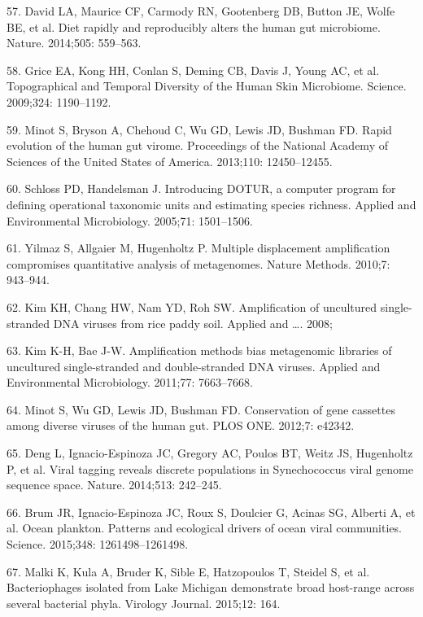 \documentclass[12pt,]{article}
\begin{document}
\hypertarget{ref-David:2014cl}{}
57. David LA, Maurice CF, Carmody RN, Gootenberg DB, Button JE, Wolfe
BE, et al. Diet rapidly and reproducibly alters the human gut
microbiome. Nature. 2014;505: 559--563.

\hypertarget{ref-Grice:2009ee}{}
58. Grice EA, Kong HH, Conlan S, Deming CB, Davis J, Young AC, et al.
Topographical and Temporal Diversity of the Human Skin Microbiome.
Science. 2009;324: 1190--1192.

\hypertarget{ref-Minot:2013ih}{}
59. Minot S, Bryson A, Chehoud C, Wu GD, Lewis JD, Bushman FD. Rapid
evolution of the human gut virome. Proceedings of the National Academy
of Sciences of the United States of America. 2013;110: 12450--12455.

\hypertarget{ref-Schloss:2005hz}{}
60. Schloss PD, Handelsman J. Introducing DOTUR, a computer program for
defining operational taxonomic units and estimating species richness.
Applied and Environmental Microbiology. 2005;71: 1501--1506.

\hypertarget{ref-Yilmaz:2010jb}{}
61. Yilmaz S, Allgaier M, Hugenholtz P. Multiple displacement
amplification compromises quantitative analysis of metagenomes. Nature
Methods. 2010;7: 943--944.

\hypertarget{ref-Kim:2008to}{}
62. Kim KH, Chang HW, Nam YD, Roh SW. Amplification of uncultured
single-stranded DNA viruses from rice paddy soil. Applied and \ldots{}.
2008;

\hypertarget{ref-Kim:2011hp}{}
63. Kim K-H, Bae J-W. Amplification methods bias metagenomic libraries
of uncultured single-stranded and double-stranded DNA viruses. Applied
and Environmental Microbiology. 2011;77: 7663--7668.

\hypertarget{ref-Minot:2012ed}{}
64. Minot S, Wu GD, Lewis JD, Bushman FD. Conservation of gene cassettes
among diverse viruses of the human gut. PLOS ONE. 2012;7: e42342.

\hypertarget{ref-Deng:2014eb}{}
65. Deng L, Ignacio-Espinoza JC, Gregory AC, Poulos BT, Weitz JS,
Hugenholtz P, et al. Viral tagging reveals discrete populations in
Synechococcus viral genome sequence space. Nature. 2014;513: 242--245.

\hypertarget{ref-Brum:2015iaa}{}
66. Brum JR, Ignacio-Espinoza JC, Roux S, Doulcier G, Acinas SG, Alberti
A, et al. Ocean plankton. Patterns and ecological drivers of ocean viral
communities. Science. 2015;348: 1261498--1261498.

\hypertarget{ref-Malki:2015dw}{}
67. Malki K, Kula A, Bruder K, Sible E, Hatzopoulos T, Steidel S, et al.
Bacteriophages isolated from Lake Michigan demonstrate broad host-range
across several bacterial phyla. Virology Journal. 2015;12: 164.
\end{document}
